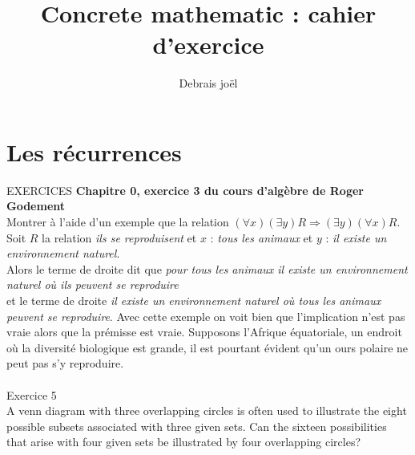 \documentclass[9pt]{amsart}
\begin{document}
\title{Concrete mathematic : cahier d'exercice}
\author{Debrais joël}
\maketitle
\section{Les récurrences}
\noindent EXERCICES\newline\newline
\textbf{Chapitre 0, exercice 3 du cours d'algèbre de Roger Godement}\\
Montrer à l'aide d'un exemple que la relation $(\forall x) (\exists y) R \Rightarrow (\exists y) (\forall x) R$. Soit $R$ la relation \textit{ils se reproduisent} et $x$ : \textit{tous les animaux} et $y$ : \textit{il existe un environnement naturel}.\\
Alors le terme de droite dit que \textit{pour tous les animaux il existe un environnement naturel où ils peuvent se reproduire} 
\\et le terme de droite \textit{il existe un environnement naturel où tous les animaux peuvent se reproduire}.
Avec cette exemple on voit bien que l'implication n'est pas vraie alors que la prémisse est vraie. Supposons l'Afrique équatoriale, un endroit où la diversité biologique est grande, il est pourtant évident qu'un ours polaire ne peut pas s'y reproduire. \\
\\\noindent Exercice 5\\
A venn diagram with three overlapping circles is often used to illustrate the eight possible subsets associated with three given sets. 
Can the sixteen possibilities that arise with four given sets be illustrated by four overlapping circles?\newline
\end{document}
